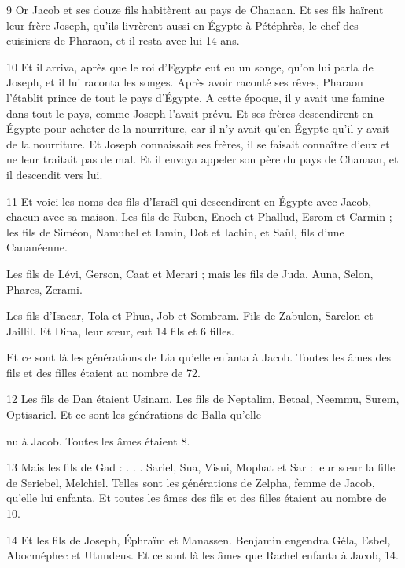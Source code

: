 \par 9 Or Jacob et ses douze fils habitèrent au pays de Chanaan. Et ses fils haïrent leur frère Joseph, qu'ils livrèrent aussi en Égypte à Pétéphrès, le chef des cuisiniers de Pharaon, et il resta avec lui 14 ans.

\par 10 Et il arriva, après que le roi d'Egypte eut eu un songe, qu'on lui parla de Joseph, et il lui raconta les songes. Après avoir raconté ses rêves, Pharaon l'établit prince de tout le pays d'Égypte. A cette époque, il y avait une famine dans tout le pays, comme Joseph l'avait prévu. Et ses frères descendirent en Égypte pour acheter de la nourriture, car il n'y avait qu'en Égypte qu'il y avait de la nourriture. Et Joseph connaissait ses frères, il se faisait connaître d'eux et ne leur traitait pas de mal. Et il envoya appeler son père du pays de Chanaan, et il descendit vers lui.

\par 11 Et voici les noms des fils d'Israël qui descendirent en Égypte avec Jacob, chacun avec sa maison. Les fils de Ruben, Enoch et Phallud, Esrom et Carmin ; les fils de Siméon, Namuhel et Iamin, Dot et Iachin, et Saül, fils d'une Cananéenne.

\par Les fils de Lévi, Gerson, Caat et Merari ; mais les fils de Juda, Auna, Selon, Phares, Zerami.

\par Les fils d'Isacar, Tola et Phua, Job et Sombram. Fils de Zabulon, Sarelon et Jaillil. Et Dina, leur sœur, eut 14 fils et 6 filles.

\par Et ce sont là les générations de Lia qu'elle enfanta à Jacob. Toutes les âmes des fils et des filles étaient au nombre de 72.

\par 12 Les fils de Dan étaient Usinam. Les fils de Neptalim, Betaal, Neemmu, Surem, Optisariel. Et ce sont les générations de Balla qu'elle
\par nu à Jacob. Toutes les âmes étaient 8.

\par 13 Mais les fils de Gad : . . . Sariel, Sua, Visui, Mophat et Sar : leur sœur la fille de Seriebel, Melchiel. Telles sont les générations de Zelpha, femme de Jacob, qu'elle lui enfanta. Et toutes les âmes des fils et des filles étaient au nombre de 10.

\par 14 Et les fils de Joseph, Éphraïm et Manassen. Benjamin engendra Géla, Esbel, Abocméphec et Utundeus. Et ce sont là les âmes que Rachel enfanta à Jacob, 14.

